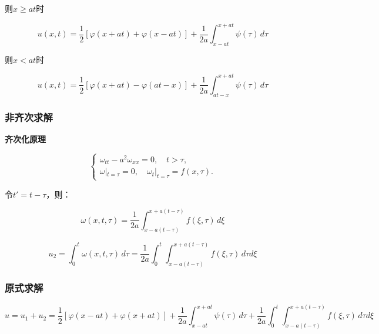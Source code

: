 则$x \geq at$时

\[
u(x, t) = \frac{1}{2} \left[ \varphi (x + at) + \varphi (x - at) \right] + \frac{1}{2a} \int_{x - at}^{x + at} \psi (\tau ) \, d\tau 
\]

则$x < at$时

\[
u(x, t) = \frac{1}{2} \left[ \varphi (x + at) - \varphi (at - x) \right] + \frac{1}{2a} \int_{at - x}^{x + at} \psi (\tau ) \, d\tau 
\]

\subsubsection{非齐次求解}

\textbf{齐次化原理}

\[
\left\{
\begin{aligned}
\omega_{tt} - a^2 \omega_{xx} = 0, \quad t > \tau, \\
\omega|_{t=\tau} = 0, \quad \omega_t|_{t=\tau} = f(x,\tau).
\end{aligned}
\right.
\]

令$t'=t-\tau$，则：

\[
\omega(x,t,\tau)=\frac{1}{2a} \int_{x-a(t-\tau)}^{x+a(t-\tau)}f(\xi,\tau) \, d\xi
\]

\[
u_2=\int_{0}^{t}\omega(x,t,\tau)\,d\tau = \frac{1}{2a} \int_{0}^{t} \int_{x-a(t-\tau)}^{x+a(t-\tau)}f(\xi,\tau) \, d\tau d\xi
\]

\subsubsection{原式求解}

\[
u=u_1+u_2=\frac{1}{2} \left[ \varphi (x - at) + \varphi (x + at) \right] + \frac{1}{2a} \int_{x - at}^{x + at} \psi (\tau ) \, d\tau + \frac{1}{2a} \int_{0}^{t} \int_{x-a(t-\tau)}^{x+a(t-\tau)}f(\xi,\tau) \, d\tau d\xi
\]